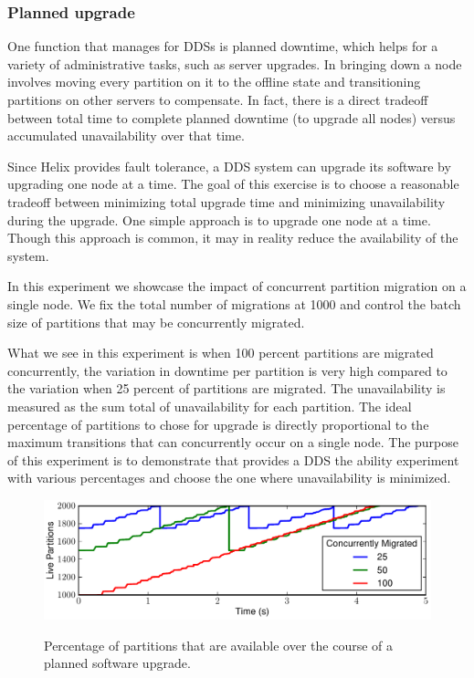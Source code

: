\subsubsection{Planned upgrade}
\label{sec:downtime}
%
One function that \helix manages for DDSs is planned downtime, which helps for a
variety of administrative tasks, such as server upgrades.  In \ES bringing down
a node involves moving every partition on it to the offline state and
transitioning partitions on other servers to compensate. In fact, there
is a direct tradeoff between total time to complete planned downtime (\eg to
upgrade all nodes) versus accumulated unavailability over that time. 

Since Helix provides fault tolerance, a DDS system can upgrade its software by upgrading one node at a time. 
The goal of this exercise is to choose a reasonable tradeoff between minimizing
total upgrade time and minimizing unavailability during the upgrade. 
One simple approach is to upgrade one node at a time. 
Though this approach is common, it may in reality reduce the availability of the
system. 

In this experiment we showcase the impact of concurrent partition migration on a
single node. We fix the total number of migrations at 1000 and control the
batch size of partitions that may be concurrently migrated. 

What we see in this experiment is when 100 percent partitions are migrated
 concurrently, the variation in downtime per partition is very high compared to
 the variation when 25 percent of partitions are migrated. The unavailability is
 measured as the sum total of unavailability for each partition. The ideal
 percentage of partitions to chose for upgrade is directly proportional to the
 maximum transitions that can concurrently occur on a single node. The purpose
 of this experiment is to demonstrate that \helix provides a DDS the ability experiment
 with various percentages and choose the one where unavailability is minimized.

\begin{figure}[t]
    {\includegraphics[width=\columnwidth]{migration-timeseries.pdf}}
    \vspace*{-2ex}
    \caption{\label{fig:migration_timeseries} Percentage of partitions that are
available over the course of a planned software upgrade.}
\end{figure}

